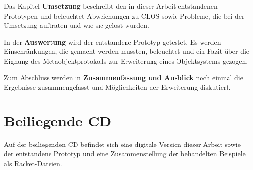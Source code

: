 Das Kapitel \textbf{Umsetzung} beschreibt den in dieser Arbeit entstandenen Prototypen und beleuchtet Abweichungen zu CLOS sowie Probleme, die bei der Umsetzung auftraten und wie sie gelöst wurden.

In der \textbf{Auswertung} wird der entstandene Prototyp getestet. Es werden Einschränkungen, die gemacht werden mussten, beleuchtet und ein Fazit über die Eignung des Metaobjektprotokolls zur Erweiterung eines Objektsystems gezogen.

Zum Abschluss werden in \textbf{Zusammenfassung und Ausblick} noch einmal die Ergebnisse zusammengefasst und Möglichkeiten der Erweiterung diskutiert.

\section{Beiliegende CD}
Auf der beiliegenden CD befindet sich eine digitale Version dieser Arbeit sowie der entstandene Prototyp und eine Zusammenstellung der behandelten Beispiele als Racket-Dateien.

